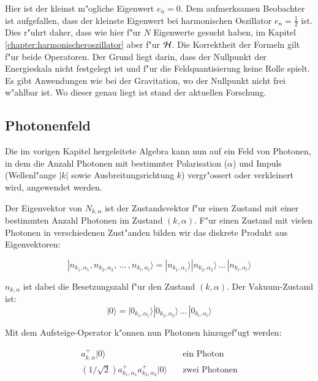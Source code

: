 Hier ist der kleinst m"ogliche Eigenwert $e_n = 0$. Dem aufmerksamen Beobachter ist aufgefallen, dass der kleinste Eigenwert bei harmonischen Oszillator $e_n = \frac{1}{2}$ ist. Dies r"uhrt daher, dass wie hier f"ur $N$ Eigenwerte gesucht haben, im Kapitel \ref{chapter:harmonischeroszillator} aber f"ur ${\cal H}$. Die Korrektheit der Formeln gilt f"ur beide Operatoren. Der Grund liegt darin, dass der Nullpunkt der Energieskala nicht festgelegt ist und f"ur die Feldquantisierung keine Rolle spielt. Es gibt Anwendungen wie bei der Gravitation, wo der Nullpunkt nicht frei w"ahlbar ist. Wo dieser genau liegt ist stand der aktuellen Forschung.

\subsection{Photonenfeld}

Die im vorigen Kapitel hergeleitete Algebra kann nun auf ein Feld von Photonen, in dem die Anzahl Photonen mit bestimmter Polarisation ($\alpha$) und Impuls (Wellenl"ange $|k|$ sowie Ausbreitungsrichtung $k$) vergr"ossert oder verkleinert wird, angewendet werden.

Der Eigenvektor von $N_{k,\alpha}$ ist der Zustandsvektor f"ur einen Zustand mit einer bestimmten Anzahl Photonen im Zustand $(k,\alpha)$. F"ur einen Zustand mit vielen Photonen in verschiedenen Zust"anden bilden wir das diskrete Produkt aus Eigenvektoren:

\begin{equation}
|n_{k_1,\alpha_1}, n_{k_2,\alpha_2}, \, \hdots \, , n_{k_l,\alpha_l}\rangle = |n_{k_1,\alpha_1}\rangle |n_{k_2,\alpha_2}\rangle \, \hdots \, |n_{k_l,\alpha_l}\rangle
\end{equation}

$n_{k,\alpha}$ ist dabei die Besetzungszahl f"ur den Zustand $(k,\alpha)$. Der Vakuum-Zustand ist:
\begin{equation}
|0\rangle = |0_{k_1,\alpha_1}\rangle |0_{k_2,\alpha_2}\rangle \, \hdots \, |0_{k_l,\alpha_l}\rangle
\end{equation}

Mit dem Aufsteige-Operator k"onnen nun Photonen hinzugef"ugt werden:

\begin{equation}
\begin{split}
a^+_{k,\alpha}|0\rangle & \quad \text{ein Photon}\\
\left(1/\sqrt{2}\right)a^+_{k_1,\alpha_1}a^+_{k_2,\alpha_2}|0\rangle & \quad \text{zwei Photonen}\\
\end{split}
\end{equation}

